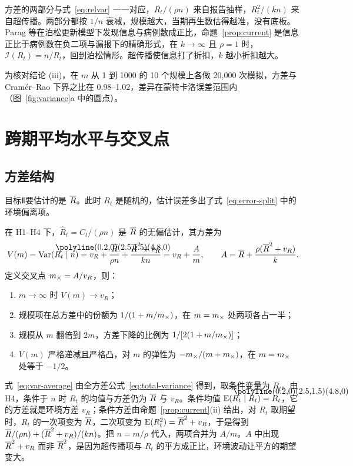 方差的两部分与式~\eqref{eq:relvar} 一一对应，$R_t/(\rho n)$ 来自报告抽样，$R_t^2/(kn)$ 来自超传播。两部分都按 $1/n$ 衰减，规模越大，当期再生数估得越准，没有底板。Parag 等在泊松更新模型下发现信息与病例数成正比\citep{parag2022quantifying}，命题~\ref{prop:current} 是信息正比于病例数在负二项与漏报下的精确形式，在 $k\to\infty$ 且 $\rho=1$ 时，$\mathcal{I}(R_t)=n/R_t$，回到泊松情形。超传播使信息打了折扣，$k$ 越小折扣越大。

为核对结论 (iii)，在 $m$ 从 1 到 1000 的 10 个规模上各做 20,000 次模拟，方差与 Cramér--Rao 下界之比在 0.98--1.02，差异在蒙特卡洛误差范围内（图~\ref{fig:variance}a 中的圆点）。

\section{跨期平均水平与交叉点}
\label{sec:model-average}

\subsection{方差结构}

目标Ⅱ要估计的是 $\overline{R}$。此时 $R_t$ 是随机的，估计误差多出了式~\eqref{eq:error-split} 中的环境偏离项。

\begin{proposition}[跨期平均水平的方差]
\label{prop:average}
在 H1--H4 下，$\widehat R_t=C_t/(\rho n)$ 是 $\overline{R}$ 的无偏估计，其方差为
\begin{equation}
  V(m)=\Var(\widehat R_t\mid n)=v_R+\frac{\Rbar}{\rho n}+\frac{\Rbar^2+v_R}{kn}
  =v_R+\frac{A}{m},\qquad A=\Rbar+\frac{\rho(\Rbar^2+v_R)}{k}.
  \label{eq:var-average}
\end{equation}
定义交叉点 $m_{\times}=A/v_R$，则：
\begin{enumerate}[label=(\roman*)]
  \item $m\to\infty$ 时 $V(m)\to v_R$；
  \item 规模项在总方差中的份额为 $1/(1+m/m_{\times})$，在 $m=m_{\times}$ 处两项各占一半；
  \item 规模从 $m$ 翻倍到 $2m$，方差下降的比例为 $1/[2(1+m/m_{\times})]$；
  \item $V(m)$ 严格递减且严格凸，对 $m$ 的弹性为 $-m_{\times}/(m+m_{\times})$，在 $m=m_{\times}$ 处等于 $-1/2$。
\end{enumerate}
\end{proposition}

式~\eqref{eq:var-average} 由全方差公式~\eqref{eq:total-variance} 得到，取条件变量为 $R_t$。由 H4，条件于 $n$ 时 $R_t$ 的均值与方差仍为 $\overline{R}$ 与 $v_R$。条件均值 $\E(\widehat R_t\mid R_t)=R_t$，它的方差就是环境方差 $v_R$；条件方差由命题~\ref{prop:current}(ii) 给出，对 $R_t$ 取期望时，$R_t$ 的一次项变为 $\overline{R}$，二次项变为 $\operatorname{E}(R_t^2)=\overline{R}^2+v_R$，于是得到 $\overline{R}/(\rho n)+(\overline{R}^2+v_R)/(kn)$。把 $n=m/\rho$ 代入，两项合并为 $A/m$。$A$ 中出现 $\overline{R}^2+v_R$ 而非 $\overline{R}^2$，是因为超传播项与 $R_t$ 的平方成正比，环境波动让平方的期望变大。

